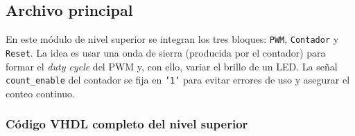 \documentclass[a4paper,12pt]{article}
\begin{document}
\subsection{Archivo principal}

En este módulo de nivel superior se integran los tres bloques: \texttt{PWM}, \texttt{Contador} y \texttt{Reset}. La idea es usar una onda de sierra (producida por el contador) para formar el \textit{duty cycle} del PWM y, con ello, variar el brillo de un LED. La señal \texttt{count\_enable} del contador se fija en \texttt{'1'} para evitar errores de uso y asegurar el conteo continuo.

\newpage

\subsubsection{Código VHDL completo del nivel superior}
\end{document}
